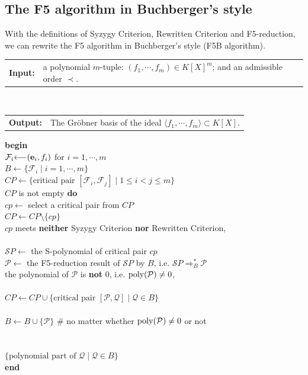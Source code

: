 \documentclass[preprint,authoryear,3p,12pt]{elsarticle}
\makeatletter
\newcommand{\Input}[1]
  {\noindent\begin{tabular}{@{}p{1.8cm}@{}p{13.2cm}@{}}
   {\bf Input: }&#1 \end{tabular}}
\newcommand{\Output}[1]
  {\noindent\begin{tabular}{@{}p{1.8cm}@{}p{13.2cm}@{}}
   {\bf Output: }&#1 \end{tabular}}
\def\eb{{\bf e}}
\def\gr{{Gr\"obner }}
\def\p{{\rm{poly}}}
\def\lif{{\bf if \,}}
\def\lthen{{\bf then \,}}
\def\lendif{{\bf end if\,}}
\def\lwhile{{\bf while \,}}
\def\lendwhile{{\bf end while\,}}
\def\ldo{{\bf do \,}}
\def\lend{{\bf end \,}}
\def\lreturn{{\bf return \,}}
\def\lla{{\longleftarrow}}
\def\lbegin{{\bf begin}}
\newcommand{\SPC}{\hspace*{15pt}}
\makeatother
\begin{document}
\subsection{The F5 algorithm in Buchberger's style} \label{subsec-buchstyle}


With the definitions of Syzygy Criterion, Rewritten Criterion and
F5-reduction, we can rewrite the F5 algorithm in Buchberger's style
(F5B algorithm).

\begin{algorithm} \caption{\bf --- The F5 algorithm in Buchberger's style (F5B algorithm)} \label{algorithm1}
  \smallskip
  \Input{a polynomial $m$-tuple: $(f_1,\cdots,f_m)\in K[X]^m$; and an admissible order $\prec$.}\\
  \Output{The \gr basis of the ideal $\langle f_1,\cdots,f_m\rangle \subset K[X]$.}
  \medskip

  \noindent
  \lbegin\\
  \SPC ${\mathcal F}_i \lla (\eb_i, f_i)$ for $i=1,\cdots,m$\\
  \SPC $B \lla \{{\mathcal F}_i  \mid  i=1,\cdots,m\}$\\
  \SPC $CP \lla \{\mbox{critical pair } [{\mathcal F}_i, {\mathcal F}_j] \mid  1\le i<j \le  m\}$\\
  \SPC  \lwhile $CP$ is not empty \ldo\\
  \SPC\SPC  $cp \lla $ select a critical pair from $CP$\\
  \SPC\SPC  $CP \lla CP \setminus \{cp\}$\\
  \SPC\SPC  \lif $cp$ meets {\bf neither} Syzygy Criterion {\bf nor} Rewritten
  Criterion,\\
  \SPC\SPC\SPC \lthen\\
  \SPC\SPC\SPC\SPC  ${\mathcal SP} \lla $ the S-polynomial of critical pair
  $cp$\\
  \SPC\SPC\SPC\SPC  ${\mathcal P} \lla $ the F5-reduction result of ${\mathcal SP}$ by $B$, i.e. ${\mathcal SP}\Longrightarrow_B^* {\mathcal P}$\\
  \SPC\SPC\SPC\SPC  \lif the polynomial of ${\mathcal P}$ is {\bf not} $0$, i.e. $\p({\mathcal P})\not= 0$,\\
  \SPC\SPC\SPC\SPC\SPC \lthen \\
  \SPC\SPC\SPC\SPC\SPC\SPC $CP \lla CP \cup \{\mbox{critical pair } [{\mathcal P}, {\mathcal Q}] \mid {\mathcal Q}\in B\}$\\
  \SPC\SPC\SPC\SPC \lendif\\
  \SPC\SPC\SPC\SPC  $B \lla B \cup \{{\mathcal P}\}$ \SPC $\#$ no matter whether $\p({\mathcal P})\not= 0$ or not\\
  \SPC\SPC \lendif\\
  \SPC \lendwhile\\
  \SPC \lreturn $\{\mbox{polynomial part of } {\mathcal Q} \mid {\mathcal Q}\in B\}$\\
  \lend
  \medskip
\end{algorithm}
\end{document}
